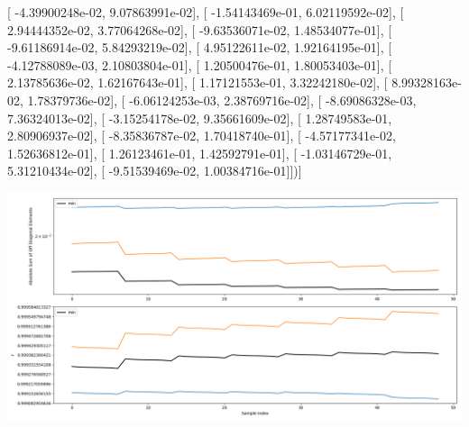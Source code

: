 \documentclass{article}
\begin{document}
       [ -4.39900248e-02,   9.07863991e-02],
       [ -1.54143469e-01,   6.02119592e-02],
       [  2.94444352e-02,   3.77064268e-02],
       [ -9.63536071e-02,   1.48534077e-01],
       [ -9.61186914e-02,   5.84293219e-02],
       [  4.95122611e-02,   1.92164195e-01],
       [ -4.12788089e-03,   2.10803804e-01],
       [  1.20500476e-01,   1.80053403e-01],
       [  2.13785636e-02,   1.62167643e-01],
       [  1.17121553e-01,   3.32242180e-02],
       [  8.99328163e-02,   1.78379736e-02],
       [ -6.06124253e-03,   2.38769716e-02],
       [ -8.69086328e-03,   7.36324013e-02],
       [ -3.15254178e-02,   9.35661609e-02],
       [  1.28749583e-01,   2.80906937e-02],
       [ -8.35836787e-02,   1.70418740e-01],
       [ -4.57177341e-02,   1.52636812e-01],
       [  1.26123461e-01,   1.42592791e-01],
       [ -1.03146729e-01,   5.31210434e-02],
       [ -9.51539469e-02,   1.00384716e-01]])]
\begin{center}
\includegraphics[scale=.9]{report_pickled_controls123/control_dpn_all.png}

\end{center}
\end{document}
